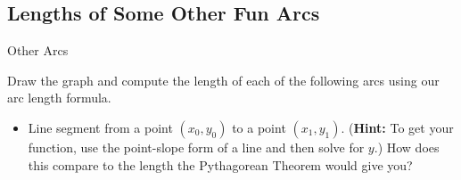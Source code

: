 \subsection{Lengths of Some Other Fun Arcs}
\begin{exercise}{Other Arcs \Coffeecup \Coffeecup \Coffeecup}

Draw the graph and compute the length of each of the following arcs using our arc length formula.
\begin{itemize}
\item Line segment from a point $(x_0,y_0)$ to a point $(x_1,y_1) $.  ({\bf Hint:} To get your function, use the point-slope form of a line and then solve for $y$.)  How does this compare to the length the Pythagorean Theorem would give you?



\end{itemize}
\end{exercise}
